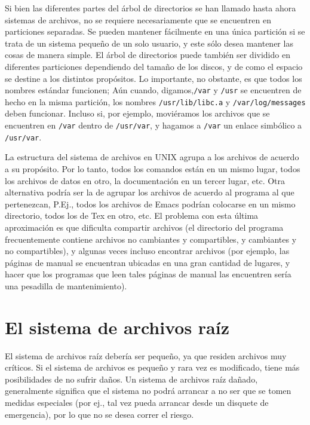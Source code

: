 \documentclass[12pt]{article}
\begin{document}
Si bien las diferentes partes del árbol de directorios se han
llamado hasta ahora sistemas de archivos, no se requiere necesariamente que se
encuentren en particiones separadas. Se pueden mantener fácilmente en una única
partición si se trata de un sistema pequeño de un solo usuario, y este sólo
desea mantener las cosas de manera simple. El árbol de directorios puede también
ser dividido en  diferentes particiones dependiendo del tamaño de los discos, y
de como el espacio se destine a los distintos propósitos. Lo importante, no
obstante, es que todos los nombres estándar funcionen; Aún cuando,
digamos,\texttt{/var} y \texttt{/usr} se encuentren de
hecho en la misma partición, los nombres \texttt{/usr/lib/libc.a} y
\texttt{/var/log/messages} deben funcionar. Incluso si, por ejemplo,
moviéramos los archivos que se encuentren en \texttt{/var} dentro de
\texttt{/usr/var}, y hagamos a \texttt{/var} un enlace
simbólico a \texttt{/usr/var}.

 La estructura del sistema de archivos en UNIX agrupa a los archivos de
acuerdo a su propósito. Por lo tanto, todos los comandos están en un mismo
lugar, todos los archivos de datos en otro, la documentación en un tercer lugar,
etc.  Otra alternativa podría ser la de agrupar los archivos de acuerdo al
programa al que pertenezcan, P.Ej., todos los archivos de Emacs podrían
colocarse en un mismo directorio, todos los de Tex en otro, etc. El problema con
esta última aproximación es que dificulta compartir archivos (el directorio del
programa frecuentemente contiene archivos no cambiantes y compartibles, y
cambiantes y no compartibles), y algunas veces incluso encontrar archivos (por
ejemplo, las páginas de manual se encuentran ubicadas en una gran cantidad de
lugares, y hacer que los programas que leen tales páginas de manual las
encuentren sería una pesadilla de mantenimiento).  




\section{ El sistema de archivos raíz}

 El sistema de archivos raíz debería ser pequeño, ya que residen archivos
muy críticos. Si el sistema de archivos es pequeño y rara vez es modificado,
tiene más posibilidades de no sufrir daños. Un sistema de archivos raíz dañado,
generalmente significa que el sistema no podrá arrancar a no ser que se tomen
medidas especiales (por ej., tal vez pueda arrancar desde un disquete de
emergencia), por lo que no se desea correr el riesgo.  
\end{document}
